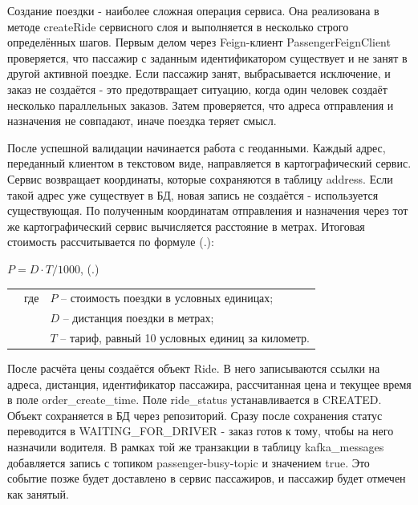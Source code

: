 {  \par \redline Создание поездки - наиболее сложная операция сервиса. Она реализована в методе createRide сервисного слоя и выполняется в несколько строго определённых шагов. Первым делом через Feign-клиент PassengerFeignClient проверяется, что пассажир с заданным идентификатором существует и не занят в другой активной поездке. Если пассажир занят, выбрасывается исключение, и заказ не создаётся - это предотвращает ситуацию, когда один человек создаёт несколько параллельных заказов. Затем проверяется, что адреса отправления и назначения не совпадают, иначе поездка теряет смысл.

  \par \redline После успешной валидации начинается работа с геоданными. Каждый адрес, переданный клиентом в текстовом виде, направляется в картографический сервис. Сервис возвращает координаты, которые сохраняются в таблицу address. Если такой адрес уже существует в БД, новая запись не создаётся - используется существующая. По полученным координатам отправления и назначения через тот же картографический сервис вычисляется расстояние в метрах. Итоговая стоимость рассчитывается по формуле (\thechaptercntr .\theformulacntr):

  \formulaspace \par \redline
    $P = D \cdot T / 1000$,
    \hfill (\thechaptercntr .\theformulacntr) \redline
  \formulaspace \addtocounter{formulacntr}{1}

  \begin{tabular}{p{}p{}p{}}
    & где  & $P$ {--} стоимость поездки в условных единицах; \\
    &      & $D$ {--} дистанция поездки в метрах; \\
    &      & $T$ {--} тариф, равный 10 условных единиц за километр. \\
  \end{tabular}

  \par \redline После расчёта цены создаётся объект Ride. В него записываются ссылки на адреса, дистанция, идентификатор пассажира, рассчитанная цена и текущее время в поле order\_create\_time. Поле ride\_status устанавливается в CREATED. Объект сохраняется в БД через репозиторий. Сразу после сохранения статус переводится в WAITING\_FOR\_DRIVER - заказ готов к тому, чтобы на него назначили водителя. В рамках той же транзакции в таблицу kafka\_messages добавляется запись с топиком passenger-busy-topic и значением true. Это событие позже будет доставлено в сервис пассажиров, и пассажир будет отмечен как занятый.

}

